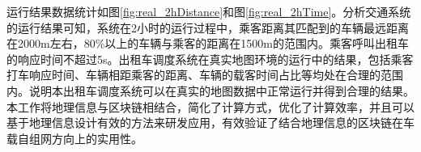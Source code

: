 运行结果数据统计如图\ref{fig:real_2hDistance}和图\ref{fig:real_2hTime}。分析交通系统的运行结果可知，系统在2小时的运行过程中，乘客距离其匹配到的车辆最远距离在2000m左右，80$\%$以上的车辆与乘客的距离在1500m的范围内。乘客呼叫出租车的响应时间不超过5s。出租车调度系统在真实地图环境的运行中的结果，包括乘客打车响应时间、车辆相距乘客的距离、车辆的载客时间占比等均处在合理的范围内。说明本出租车调度系统可以在真实的地图数据中正常运行并得到合理的结果。本工作将地理信息与区块链相结合，简化了计算方式，优化了计算效率，并且可以基于地理信息设计有效的方法来研发应用，有效验证了结合地理信息的区块链在车载自组网方向上的实用性。

